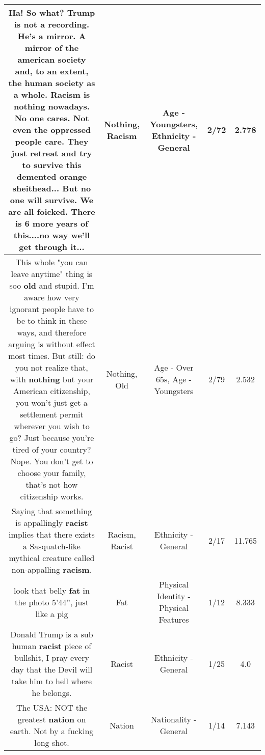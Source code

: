 \documentclass[11pt]{article}
\newlength\mylength
\begin{document}
\begin{center}
\begin{longtable}{|C{.65\mylength}|C{.30\mylength}|C{.12\mylength}|C{.12\mylength}|C{.12\mylength}|}
  \small Ha! So what? Trump is not a recording. He's a mirror. A mirror of the american society and, to an extent, the human society as a whole. \textbf{Racism} is \textbf{nothing} nowadays. No one cares. Not even  the oppressed people care. They just retreat and try to survive this demented orange  sheithead... But no one will survive. We are all foicked. There is 6 more years of this....no way we'll get through it...\normalsize   & Nothing, Racism & Age - Youngsters, Ethnicity - General & 2/72 & 2.778 \\  \hline
  \small This whole "you can leave anytime" thing is soo \textbf{old} and stupid. I'm aware how very ignorant people have to be to think in these ways, and therefore arguing is without effect most times. But still: do you not realize that, with \textbf{nothing} but your American citizenship, you won't just get a settlement permit wherever you wish to go? Just because you're tired of your country? Nope. You don't get to choose your family, that's not how citizenship works.\normalsize   & Nothing, Old & Age - Over 65s, Age - Youngsters & 2/79 & 2.532 \\  \hline
  \small Saying that something is appallingly \textbf{racist} implies that there exists a Sasquatch-like mythical creature called non-appalling \textbf{racism}.\normalsize   & Racism, Racist & Ethnicity - General & 2/17 & 11.765 \\  \hline
  \small look that belly \textbf{fat} in the photo 5'44'', just like a pig\normalsize   & Fat & Physical Identity - Physical Features & 1/12 & 8.333 \\  \hline
  \small Donald Trump is a sub human \textbf{racist} piece of bullshit, I pray every day that the Devil will take him to hell where he  belongs.\normalsize   & Racist & Ethnicity - General & 1/25 & 4.0 \\  \hline
  \small The USA: NOT the greatest \textbf{nation} on earth. Not by a fucking long shot.\normalsize   & Nation & Nationality - General & 1/14 & 7.143 \\  \hline

\end{longtable}
\end{center}
\end{document}
